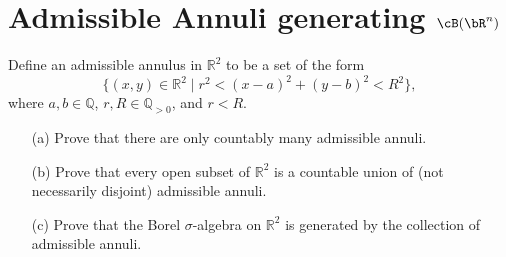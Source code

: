 \documentclass[lang=cn,11pt]{elegantbook}
\begin{document}
\section{Admissible Annuli generating $\cB(\bR^n)$} 
Define an admissible annulus in $\mathbb{R}^2$ to be a set of the form
\[
\{(x, y) \in \mathbb{R}^2 \mid r^2 < (x - a)^2 + (y - b)^2 < R^2\},
\]
where $a, b \in \mathbb{Q}$, $r, R \in \mathbb{Q}_{>0}$, and $r < R$.

\begin{itemize}
    \item[(a)] Prove that there are only countably many admissible annuli.
    \item[(b)] Prove that every open subset of $\mathbb{R}^2$ is a countable union of (not necessarily disjoint) admissible annuli.
    \item[(c)] Prove that the Borel $\sigma$-algebra on $\mathbb{R}^2$ is generated by the collection of admissible annuli.
\end{itemize}
\end{document}
